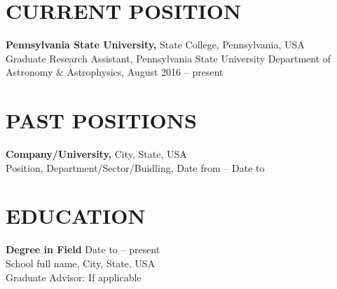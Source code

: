 \documentclass[11pt]{res} %
\newcommand{\titlegap}{5pt} %
\newcommand{\sectgap}{0.05in} %
\begin{document}
\begin{resume}

\section{CURRENT POSITION}
\vspace{\titlegap}
{\bf Pennsylvania State University,} State College, Pennsylvania, USA\\
Graduate Research Assistant, Pennsylvania State University Department of Astronomy \& Astrophysics, August 2016 -- present

\vspace{\sectgap}


\section{PAST POSITIONS}
\vspace{\titlegap}
{\bf Company/University,} City, State, USA\\
Position, Department/Sector/Buidling, Date from -- Date to

\vspace{\sectgap}

\section{EDUCATION} %

\vspace{\titlegap}

{\bf Degree in Field} \hfill Date to -- present \\ 
School full name, City, State, USA \\
Graduate Advisor: If applicable

\vspace{\sectgap}



\end{resume}
\end{document}

